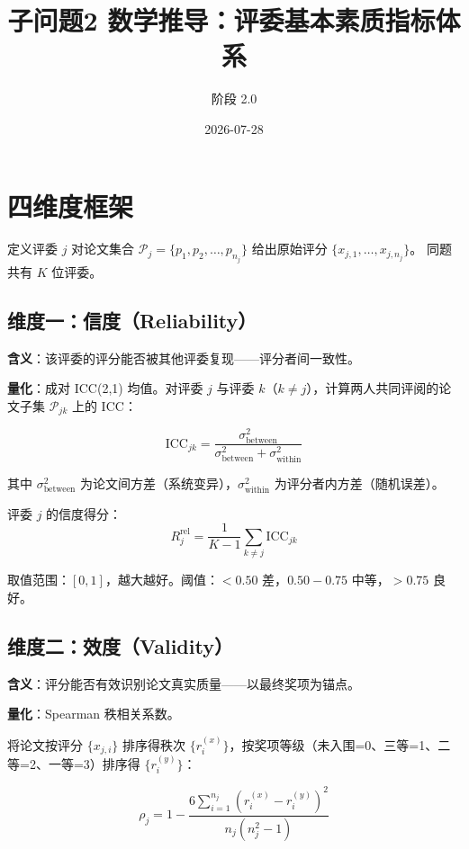 \documentclass[UTF8]{ctexart}
\title{子问题2 数学推导：评委基本素质指标体系}
\author{阶段 2.0}
\date{2026-07-28}
\begin{document}
\maketitle

\section{四维度框架}

定义评委 $j$ 对论文集合 $\mathcal{P}_j = \{p_1, p_2, \ldots, p_{n_j}\}$ 给出原始评分 $\{x_{j,1}, \ldots, x_{j,n_j}\}$。
同题共有 $K$ 位评委。

\subsection{维度一：信度（Reliability）}

\textbf{含义}：该评委的评分能否被其他评委复现——评分者间一致性。

\textbf{量化}：成对 ICC(2,1) 均值。对评委 $j$ 与评委 $k$（$k \neq j$），计算两人共同评阅的论文子集 $\mathcal{P}_{jk}$ 上的 ICC：

\begin{equation}
\text{ICC}_{jk} = \frac{\sigma^2_{\text{between}}}{\sigma^2_{\text{between}} + \sigma^2_{\text{within}}}
\end{equation}

其中 $\sigma^2_{\text{between}}$ 为论文间方差（系统变异），$\sigma^2_{\text{within}}$ 为评分者内方差（随机误差）。

评委 $j$ 的信度得分：
\begin{equation}
R_j^{\text{rel}} = \frac{1}{K-1} \sum_{k \neq j} \text{ICC}_{jk}
\end{equation}

取值范围：$[0, 1]$，越大越好。阈值：$<0.50$ 差，$0.50-0.75$ 中等，$>0.75$ 良好。

\subsection{维度二：效度（Validity）}

\textbf{含义}：评分能否有效识别论文真实质量——以最终奖项为锚点。

\textbf{量化}：Spearman 秩相关系数。

将论文按评分 $\{x_{j,i}\}$ 排序得秩次 $\{r_i^{(x)}\}$，按奖项等级（未入围=0、三等=1、二等=2、一等=3）排序得 $\{r_i^{(y)}\}$：

\begin{equation}
\rho_j = 1 - \frac{6 \sum_{i=1}^{n_j} (r_i^{(x)} - r_i^{(y)})^2}{n_j(n_j^2 - 1)}
\end{equation}
\end{document}
